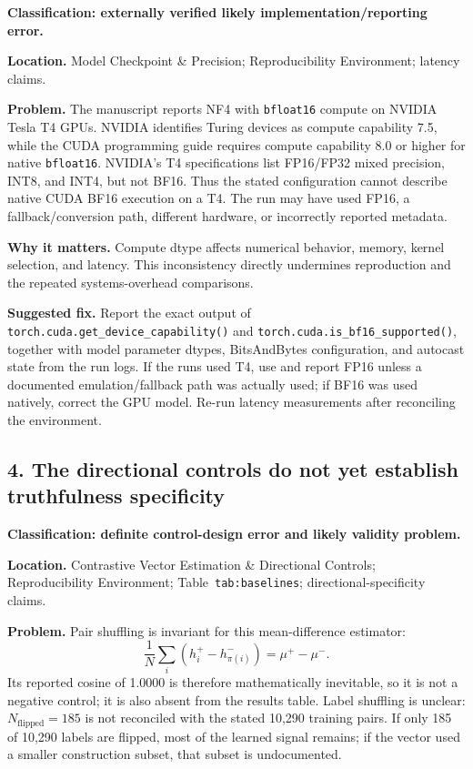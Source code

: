 \documentclass[11pt]{article}
\begin{document}
\textbf{Classification: externally verified likely implementation/reporting error.}

\textbf{Location.} Model Checkpoint \& Precision; Reproducibility Environment; latency claims.

\textbf{Problem.} The manuscript reports NF4 with \texttt{bfloat16} compute on NVIDIA Tesla T4 GPUs.  NVIDIA identifies Turing devices as compute capability 7.5, while the CUDA programming guide requires compute capability 8.0 or higher for native \texttt{bfloat16}.  NVIDIA's T4 specifications list FP16/FP32 mixed precision, INT8, and INT4, but not BF16.  Thus the stated configuration cannot describe native CUDA BF16 execution on a T4.  The run may have used FP16, a fallback/conversion path, different hardware, or incorrectly reported metadata.

\textbf{Why it matters.} Compute dtype affects numerical behavior, memory, kernel selection, and latency.  This inconsistency directly undermines reproduction and the repeated systems-overhead comparisons.

\textbf{Suggested fix.} Report the exact output of \nolinkurl{torch.cuda.get_device_capability()} and \nolinkurl{torch.cuda.is_bf16_supported()}, together with model parameter dtypes, BitsAndBytes configuration, and autocast state from the run logs.  If the runs used T4, use and report FP16 unless a documented emulation/fallback path was actually used; if BF16 was used natively, correct the GPU model.  Re-run latency measurements after reconciling the environment.

\subsection*{4. The directional controls do not yet establish truthfulness specificity}

\textbf{Classification: definite control-design error and likely validity problem.}

\textbf{Location.} Contrastive Vector Estimation \& Directional Controls; Reproducibility Environment; Table~\texttt{tab:baselines}; directional-specificity claims.

\textbf{Problem.} Pair shuffling is invariant for this mean-difference estimator:
\[
\frac{1}{N}\sum_i\left(h_i^+-h_{\pi(i)}^-\right)=\mu^+-\mu^-.
\]
Its reported cosine of 1.0000 is therefore mathematically inevitable, so it is not a negative control; it is also absent from the results table.  Label shuffling is unclear: $N_{\text{flipped}}=185$ is not reconciled with the stated 10,290 training pairs.  If only 185 of 10,290 labels are flipped, most of the learned signal remains; if the vector used a smaller construction subset, that subset is undocumented.
\end{document}
